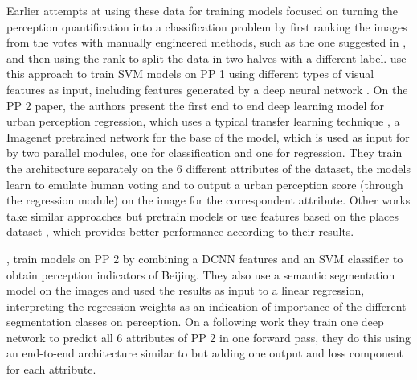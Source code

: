 Earlier attempts at using these data for training models focused on turning the perception quantification into a classification problem
by first ranking the images from the votes with manually engineered methods, such as the one suggested in
, and then using the rank to split the data in two halves with a different
label.  use this approach to train SVM models on PP 1 using different types of visual features as input,
including features generated by a  deep neural network \cite{donahue_deep}. On the PP 2 paper, the authors present the first end to end deep learning model for
urban perception regression, which uses a typical transfer learning technique \cite{survey_transfer}, a
Imagenet \cite{imagenet} pretrained  network for the base of the model, which is used as input
for by two parallel modules, one for classification and one for regression. They train the architecture
separately on the 6 different attributes of the dataset, the models learn to emulate human voting and
to output a urban perception score (through the regression module) on the image for the correspondent attribute.
Other works \cite{porzi_predicting, santani} take similar approaches but pretrain models or use features based on
the places dataset \cite{zhou_places}, which provides better performance according to their results.


, train models on PP 2 by combining a DCNN features and an SVM classifier to
obtain perception indicators of Beijing. They also use a semantic segmentation model \cite{cordts_cityscapes} on the images and used the results
as input to a linear regression, interpreting the regression weights as an indication of importance of the different segmentation
classes on perception. On a following work \cite{zhang_uncovering} they train one deep network to predict all 6 attributes of PP 2
in one forward pass, they do this using an end-to-end architecture similar to  but adding
one output and loss component for each attribute.

